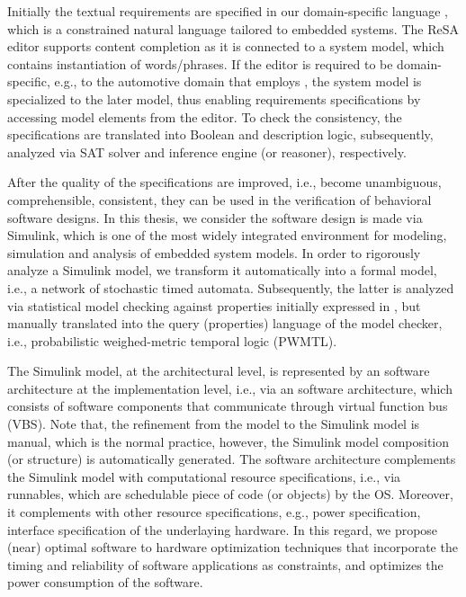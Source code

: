 Initially the textual requirements are specified in our domain-specific language \resa, which is a constrained natural language tailored to embedded systems. The ReSA editor supports content completion as it is connected to a system model, which contains instantiation of words/phrases. If the \resa{} editor is required to be domain-specific, e.g., to the automotive domain that employs \eastadl, the system model is specialized to the later model, thus enabling requirements specifications by accessing \eastadl{} model elements from the editor. To check the consistency, the \resa{} specifications are translated into Boolean and description logic, subsequently, analyzed via SAT solver and inference engine (or reasoner), respectively.

After the quality of the specifications are improved, i.e., become unambiguous,  comprehensible, consistent, they can be used in the verification of behavioral software designs. In this thesis, we consider the software design is made via Simulink, which is one of the most widely integrated environment for modeling, simulation and analysis of embedded system models. In order to rigorously analyze a Simulink model, we transform it automatically into a formal model, i.e., a network of stochastic timed automata. Subsequently, the latter is analyzed via statistical model checking against properties initially expressed in \resa, but manually translated into the query (properties) language of the model checker, i.e., probabilistic weighed-metric temporal logic (PWMTL).

The Simulink model, at the architectural level, is represented by an \eastadl software architecture at the implementation level, i.e., via an \autosar{} software architecture, which consists of software components that communicate through virtual function bus (VBS).  Note that, the refinement from the \autosar{} model to the Simulink model is manual, which is the normal practice, however, the Simulink model composition (or structure) is automatically generated. The software architecture complements the Simulink model with computational resource specifications, i.e., via runnables, which are schedulable piece of code (or objects) by the \autosar{} OS. Moreover, it complements with other resource specifications, e.g., power specification, interface specification of the underlaying hardware. In this regard, we propose (near) optimal software to hardware optimization techniques that incorporate the timing and reliability of software applications as constraints, and optimizes the power consumption of the software.

